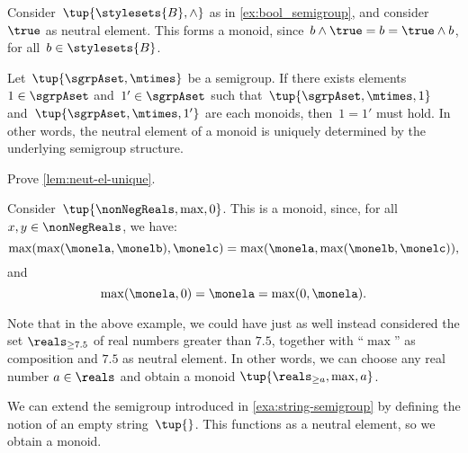 \begin{example}
  \label{ex:bool_monoid}
  Consider~$\tup{\stylesets{B},\wedge}$ as in \cref{ex:bool_semigroup}, and consider~$\true$ as neutral element.
  This forms a monoid, since~$b\wedge \true=b=\true \wedge b$, for all~$b\in \stylesets{B}$.
\end{example}

\begin{lemma}
  \label{lem:neut-el-unique}
  Let~$\tup{\sgrpAset, \mtimes}$ be a semigroup. If there exists elements~$1 \in \sgrpAset$ and~$1' \in \sgrpAset$ such that~$\tup{\sgrpAset, \mtimes, 1}$ and~$\tup{\sgrpAset, \mtimes, 1'}$ are each monoids, then~$1 = 1'$ must hold.
  In other words, the neutral element of a monoid is uniquely determined by the underlying semigroup structure.
\end{lemma}

\begin{gradedexercise}\label{ex:UniqueNeutralMonoid}
  Prove \cref{lem:neut-el-unique}.
\end{gradedexercise}


\begin{example}
  Consider~$\tup{\nonNegReals,\max,0}$. This is a monoid, since, for all~$x,y\in \nonNegReals$, we have:
  \begin{equation*}
    \max(\max(\monela,\monelb),\monelc)=\max(\monela,\max(\monelb,\monelc)),
  \end{equation*}
  and
  \begin{equation*}
    \max(\monela,0)=\monela=\max(0,\monela).
  \end{equation*}
\end{example}

\begin{remark}
  Note that in the above example, we could have just as well instead considered the set $\reals_{\geq 7.5}$ of real numbers greater than $7.5$, together with ``$\max$'' as composition and $7.5$ as neutral element.
  In other words, we can choose any real number $a \in \reals$ and obtain a monoid $\tup{\reals_{\geq a},\max, a}$.
\end{remark}




\begin{example}
  \label{exa:string-monoid}
  We can extend the semigroup introduced in \cref{exa:string-semigroup} by defining the notion of an empty string~$\tup{}$.
  This functions as a neutral element, so we obtain a monoid.
\end{example}


